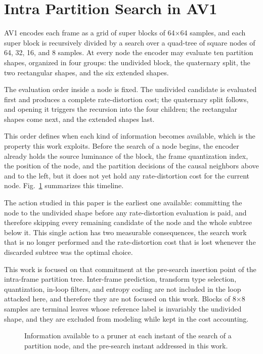 \documentclass[conference]{IEEEtran}
\begin{document}
\section{Intra Partition Search in AV1}

AV1 encodes each frame as a grid of super blocks of 64$\times$64 samples, and each
super block is recursively divided by a search over a quad-tree of square nodes of
64, 32, 16, and 8 samples. At every node the encoder may evaluate ten partition
shapes, organized in four groups: the undivided block, the quaternary split, the
two rectangular shapes, and the six extended shapes.

The evaluation order inside a node is fixed. The undivided candidate is evaluated
first and produces a complete rate-distortion cost; the quaternary split follows,
and opening it triggers the recursion into the four children; the rectangular
shapes come next, and the extended shapes last.

This order defines when each kind of information becomes available, which is the
property this work exploits. Before the search of a node begins, the encoder
already holds the source luminance of the block, the frame quantization index, the
position of the node, and the partition decisions of the causal neighbors above
and to the left, but it does not yet hold any rate-distortion cost for the current
node. Fig.~\ref{fig_timeline} summarizes this timeline.

The action studied in this paper is the earliest one available: committing the
node to the undivided shape before any rate-distortion evaluation is paid, and
therefore skipping every remaining candidate of the node and the whole subtree
below it. This single action has two measurable consequences, the search work that
is no longer performed and the rate-distortion cost that is lost whenever the
discarded subtree was the optimal choice.

This work is focused on that commitment at the pre-search insertion point of the
intra-frame partition tree. Inter-frame prediction, transform type selection,
quantization, in-loop filters, and entropy coding are not included in the loop
attacked here, and therefore they are not focused on this work. Blocks of
8$\times$8 samples are terminal leaves whose reference label is invariably the
undivided shape, and they are excluded from modeling while kept in the cost
accounting.

\begin{figure}[!t]
\centering
\caption{Information available to a pruner at each instant of the search of a
partition node, and the pre-search instant addressed in this work.}
\label{fig_timeline}
\end{figure}
\end{document}
